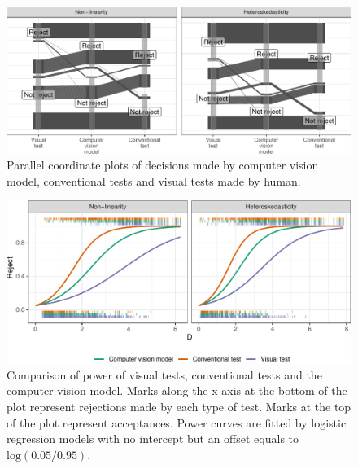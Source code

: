 \documentclass[]{interact}
\theoremstyle{plain}%
\theoremstyle{definition}
\theoremstyle{remark}
\begin{document}
\begin{figure}[!h]

{\centering \includegraphics[width=1\linewidth]{paper_files/figure-latex/pcp-1} 

}

\caption{Parallel coordinate plots of decisions made by computer vision model, conventional tests and visual tests made by human.}\label{fig:pcp}
\end{figure}

\begin{figure}[!h]

{\centering \includegraphics[width=1\linewidth]{paper_files/figure-latex/power-1} 

}

\caption{Comparison of power of visual tests, conventional tests and the computer vision model. Marks along the x-axis at the bottom of the plot represent rejections made by each type of test. Marks at the top of the plot represent acceptances. Power curves are fitted by logistic regression models with no intercept but an offset equals to $\text{log}(0.05/0.95)$.}\label{fig:power}
\end{figure}
\end{document}
